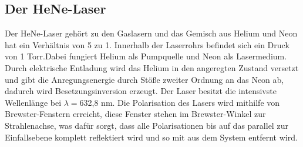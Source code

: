 \subsection{Der HeNe-Laser}
Der HeNe-Laser gehört zu den Gaslasern und das Gemisch aus Helium und Neon hat ein Verhältnis von 5 zu 1. Innerhalb der Laserrohrs befindet sich ein Druck von 1 Torr.Dabei fungiert Helium als Pumpquelle und Neon als Lasermedium. Durch elektrische Entladung wird das Helium in den angeregten Zustand versetzt und gibt die Anregungsenergie durch Stöße zweiter Ordnung an das Neon ab, dadurch wird Besetzungsinversion erzeugt. Der Laser besitzt die intensivste Wellenlänge bei $\lambda=$632,8 nm.
Die Polarisation des Lasers wird mithilfe von Brewster-Fenstern erreicht, diese Fenster stehen im Brewster-Winkel zur Strahlenachse, was dafür sorgt, dass alle Polarisationen  bis auf das parallel zur Einfallsebene komplett reflektiert wird und so mit aus dem System entfernt wird.
